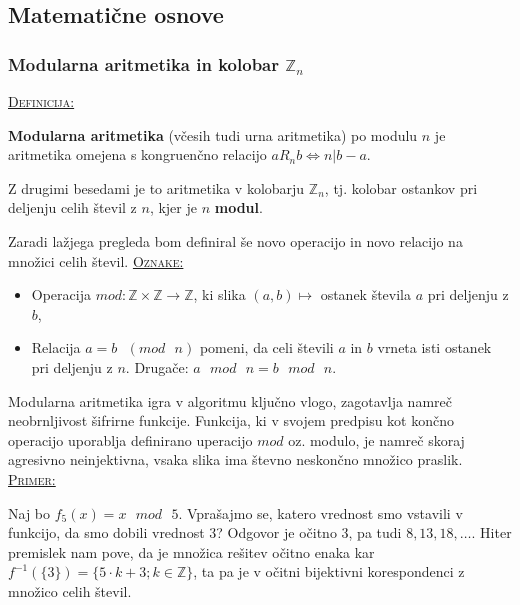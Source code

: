 \documentclass[a4paper, 12pt]{article} %
\newcommand{\Zn}{\mathbb{Z}_n}
\newenvironment{matematika}[1]{
\textcolor{bostonuniversityred}{\underline{\textsc{#1:}}}
}{
}
\begin{document}
\subsection{Matematične osnove}

\subsubsection{Modularna aritmetika in kolobar $\Zn$}

\begin{matematika}{Definicija}
\textbf{Modularna aritmetika} (včesih tudi urna aritmetika) po modulu $n$ je aritmetika omejena s kongruenčno relacijo $a R_n b \iff n | b - a$.

Z drugimi besedami je to aritmetika v kolobarju $\Zn$, tj. kolobar ostankov pri deljenju celih števil z $n$, kjer je $n$ \textbf{modul}.
\end{matematika}
\newline
\newline
Zaradi lažjega pregleda bom definiral še novo operacijo in novo relacijo na množici celih števil.
\newline
\newline
\begin{matematika}{Oznake}
\begin{itemize}[label=]
\item Operacija $mod : \mathbb{Z} \times \mathbb{Z} \to \mathbb{Z}$, ki slika $(a, b) \mapsto$ ostanek števila $a$ pri deljenju z $b$,
\item Relacija $a = b \text{ }(mod  \text{ } n)$ pomeni, da celi števili $a$ in $b$ vrneta isti ostanek pri deljenju z $n$. Drugače: $a \text{ } mod \text{ } n = b \text{ } mod \text{ } n$. 
\end{itemize}
\end{matematika}


Modularna aritmetika igra v algoritmu ključno vlogo, zagotavlja namreč neobrnljivost šifrirne funkcije. Funkcija, ki v svojem predpisu kot končno operacijo uporablja definirano uperacijo $mod$ oz. modulo, je namreč skoraj agresivno neinjektivna, vsaka slika ima števno neskončno množico praslik.
\newline
\newline
\begin{matematika}{Primer}
Naj bo $f_5(x) = x \text{ } mod \text{ } 5$. Vprašajmo se, katero vrednost smo vstavili v funkcijo, da smo dobili vrednost $3$?
\newline
Odgovor je očitno $3$, pa tudi $8, 13, 18, \dots$. Hiter premislek nam pove, da je množica rešitev očitno enaka kar $f^{-1}(\{ 3 \}) = \{ 5 \cdot k + 3; k \in \mathbb{Z} \}$, ta pa je v očitni bijektivni korespondenci z množico celih števil.
\end{matematika}
\end{document}
